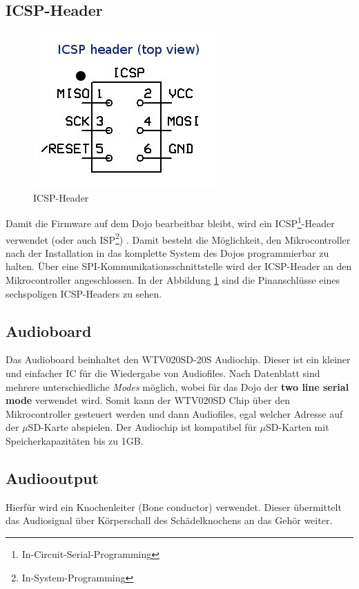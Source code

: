 \subsection{ICSP-Header}
\begin{figure}
	\vspace{-40pt}
  	\begin{center}
		\includegraphics[scale=0.6]{Bilder/icsp_header.png}
  	\end{center}
 	\vspace{-20pt}	
	\caption{ICSP-Header}
  	\vspace{-10pt}
	\label{fig:icsp_header_topview}
\end{figure}
Damit die Firmware auf dem Dojo bearbeitbar bleibt, wird ein ICSP\footnote{In-Circuit-Serial-Programming}-Header verwendet (oder auch ISP\footnote{In-System-Programming}) \cite{ispwiki}. Damit besteht die Möglichkeit, den Mikrocontroller nach der Installation in das komplette System des Dojos programmierbar zu halten. Über eine SPI-Kommunikationsschnittstelle wird der ICSP-Header an den Mikrocontroller angeschlossen. In der Abbildung \ref{fig:icsp_header_topview} sind die Pinanschlüsse eines sechspoligen ICSP-Headers zu sehen.
\newpage
\subsection{Audioboard}
Das Audioboard beinhaltet den WTV020SD-20S Audiochip. Dieser ist ein kleiner und einfacher IC für die Wiedergabe von Audiofiles. Nach Datenblatt sind mehrere unterschiedliche \textit{Modes} möglich, wobei für das Dojo der \textbf{two line serial mode} verwendet wird. Somit kann der WTV020SD Chip über den Mikrocontroller gesteuert werden und dann Audiofiles, egal welcher Adresse auf der $\mu$SD-Karte abspielen. Der Audiochip ist kompatibel für $\mu$SD-Karten mit Speicherkapazitäten bis zu 1GB. 
\subsection{Audiooutput}
Hierfür wird ein Knochenleiter (Bone conductor) verwendet. Dieser übermittelt das Audiosignal über Körperschall des Schädelknochens an das Gehör weiter.
